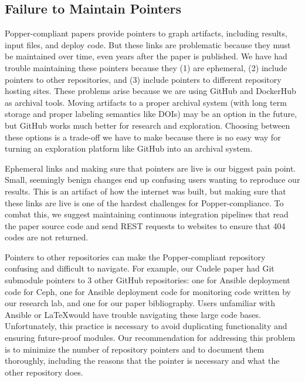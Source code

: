 \subsection{Failure to Maintain Pointers}

Popper-compliant papers provide pointers to graph artifacts, including results,
input files, and deploy code. But these links are problematic because they must
be maintained over time, even years after the paper is published. We have had
trouble maintaining these pointers because they (1) are ephemeral, (2) include
pointers to other repositories, and (3) include pointers to different
repository hosting sites. These problems arise because we are using GitHub and
DockerHub as archival tools. Moving artifacts to a proper archival system (with
long term storage and proper labeling semantics like DOIs) may be an option in
the future, but GitHub works much better for research and exploration. Choosing
between these options is a trade-off we have to make because there is no easy
way for turning an exploration platform like GitHub into an archival system.

Ephemeral links and making sure that pointers are live is our biggest pain
point. Small, seemingly benign changes end up confusing users wanting to
reproduce our results. This is an artifact of how the internet was built, but
making sure that these links are live is one of the hardest challenges for
Popper-compliance. To combat this, we suggest maintaining continuous
integration pipelines that read the paper source code and send REST requests to
websites to ensure that 404 codes are not returned.

Pointers to other repositories can make the Popper-compliant repository
confusing and difficult to navigate. For example, our Cudele paper had Git
submodule pointers to 3 other GitHub repositories: one for Ansible deployment
code for Ceph, one for Ansible deployment code for monitoring code written by
our research lab, and one for our paper bibliography. Users unfamiliar with
Ansible or \LaTeX would have trouble navigating these large code bases.
Unfortunately, this practice is necessary to avoid duplicating functionality
and ensuring future-proof modules. Our recommendation for addressing this
problem is to minimize the number of repository pointers and to document them
thoroughly, including the reasons that the pointer is necessary and what the
other repository does.

